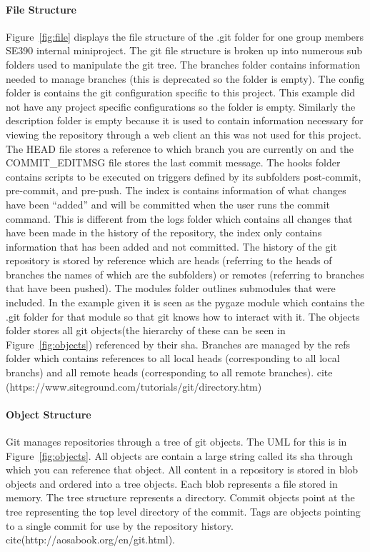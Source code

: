 \documentclass{article}
\begin{document}
\paragraph{File Structure} %
\label{par:file_structure}
    Figure~\ref{fig:file} displays the file structure of the .git folder for one group members SE390 internal miniproject. The git file structure is broken up into numerous sub folders used to manipulate the git tree. The branches folder contains information needed to manage branches (this is deprecated so the folder is empty). The config folder is contains the git configuration specific to this project. This example did not have any project specific configurations so the folder is empty. Similarly the description folder is empty because it is used to contain information necessary for viewing the repository through a web client an this was not used for this project. The HEAD file stores a reference to which branch you are currently on and the COMMIT\_EDITMSG file stores the last commit message. The hooks folder contains scripts to be executed on triggers defined by its subfolders post-commit, pre-commit, and pre-push. The index is contains information of what changes have been ``added'' and will be committed when the user runs the commit command. This is different from the logs folder which contains all changes that have been made in the history of the repository, the index only contains information that has been added and not committed. The history of the git repository is stored by reference which are heads (referring to the heads of branches the names of which are the subfolders) or remotes (referring to branches that have been pushed). The modules folder outlines submodules that were included. In the example given it is seen as the pygaze module which contains the .git folder for that module so that git knows how to interact with it. The objects folder stores all git objects(the hierarchy of these can be seen in Figure~\ref{fig:objects}) referenced by their sha. Branches are managed by the refs folder which contains references to all local heads (corresponding to all local branchs) and all remote heads (corresponding to all remote branches).
cite (https://www.siteground.com/tutorials/git/directory.htm)


\paragraph{Object Structure} %
\label{par:object_structure}
Git manages repositories through a tree of git objects. The UML for this is in Figure~\ref{fig:objects}. All objects are contain a large string called its sha through which you can reference that object. All content in a repository is stored in blob objects and ordered into a tree objects. Each blob represents a file stored in memory. The tree structure represents a directory. Commit objects point at the tree representing the top level directory of the commit. Tags are objects pointing to a single commit for use by the repository history.
cite(http://aosabook.org/en/git.html).
\end{document}
